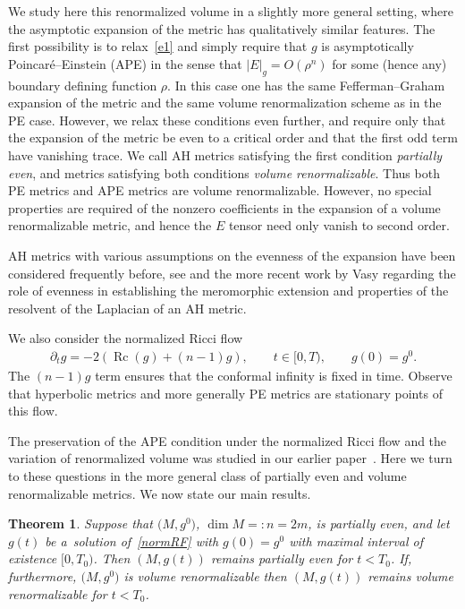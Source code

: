 \documentclass[pdftex]{sigma}
\numberwithin{equation}{section}
\newtheorem{Theorem}{Theorem}[section]
\newcommand{\gin}{{g^0}}
\DeclareMathOperator{\Rc}{Rc}
\begin{document}
We study here this renormalized volume in a slightly more general setting, where the asymptotic expansion of the metric
has qualitatively similar features. The first possibility is to relax~\eqref{e1} and simply require that $g$ is asymptotically
Poincar\'e--Einstein (APE) in the sense that $|E|_g = O(\rho^n)$ for some (hence any) boundary defining function $\rho$. In
this case one has the same Fefferman--Graham expansion of the metric and the same volume renormalization scheme as
in the PE case. However, we relax these conditions even further, and require only that the expansion of the metric be even
to a critical order and that the first odd term have vanishing trace. We call AH metrics satisfying the first condition {\it
partially even}, and metrics satisfying both conditions {\it volume renormalizable}. Thus both PE metrics and APE metrics are
volume renormalizable. However, no special properties are required of the nonzero coefficients in the expansion of
a volume renormalizable metric, and hence the $E$ tensor need only vanish to second order.

AH metrics with various assumptions on the evenness of the expansion have been considered frequently before,
see \cite{Guillarmou, MM} and the more recent work by Vasy \cite{V} regarding the role of evenness in establishing
the meromorphic extension and properties of the resolvent of the Laplacian of an AH metric.

We also consider the normalized Ricci flow
\begin{gather} \label{normRF}
\partial_t g = -2 ( \Rc(g) + (n-1)g ), \qquad t \in [0,T), \qquad g(0) = \gin.
\end{gather}
The $(n-1) g$ term ensures that the conformal infinity is fixed in time. Observe that hyperbolic metrics and more generally
PE metrics are stationary points of this flow.

The preservation of the APE condition under the normalized Ricci flow and the variation of renormalized volume was studied
in our earlier paper~\cite{BMW}. Here we turn to these questions in the more general class of partially even and volume renormalizable
metrics. We now state our main results.

\begin{Theorem}\label{TheoremA} Suppose that $\big(M,\gin\big)$, $\dim M =: n = 2m$, is partially even, and let $g(t)$ be a~solution of~\eqref{normRF} with $g(0) = \gin$
with maximal interval of existence $[0,T_0)$. Then $(M, g(t))$ remains partially even for $t < T_0$. If, furthermore, $\big(M,\gin\big)$ is volume renormalizable then $(M, g(t))$ remains volume renormalizable for $t < T_0$.
\end{Theorem}
\end{document}
